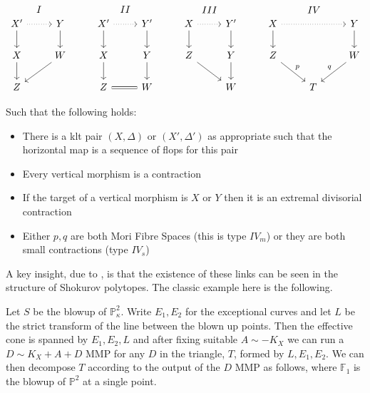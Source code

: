 \documentclass[a4paper,12pt]{book}
\begin{document}
	\[\begin{tikzcd}
	X' \arrow[d] \arrow[r, dotted] \arrow[r, "I", phantom, bend left=49] & Y \arrow[d]  & X' \arrow[r, dotted] \arrow[d] \arrow[r, "II",phantom, bend left=49] & Y' \arrow[d] & X \arrow[r, dotted] \arrow[d] \arrow[r, "III", phantom, bend left=49] & Y' \arrow[d] & X \arrow[d] \arrow[rr, dotted] \arrow[rr, "IV",phantom, bend left] &   & Y \arrow[d]       \\
	X \arrow[d]                                                          & W \arrow[ld] & X \arrow[d]                                               & Y \arrow[d]  & Z \arrow[rd]                                              & Y \arrow[d]  & Z \arrow[rd, "p"]                                          &   & W \arrow[ld, "q"'] \\
	Z                                                                    &              & Z \arrow[r, equal]                                                         & W            &                                                           & W            &                                                            & T &                  
	\end{tikzcd} \]
	
	Such that the following holds:
	\begin{itemize}
		\item There is a klt pair $(X,\Delta)$ or $(X',\Delta')$ as appropriate such that the horizontal map is a sequence of flops for this pair
		\item Every vertical morphism is a contraction
		\item If the target of a vertical morphism is $X$ or $Y$ then it is an extremal divisorial contraction
		\item Either $p,q$ are both Mori Fibre Spaces (this is type $IV_{m}$) or they are both small contractions (type $IV_{s}$)
	\end{itemize}
	
	A key insight, due to \cite{}, is that the existence of these links can be seen in the structure of Shokurov polytopes. The classic example here is the following.
	
	Let $S$ be the blowup of $\mathbb{P}^{2}_{\kappa}$. Write $E_{1},E_{2}$ for the exceptional curves and let $L$ be the strict transform of the line between the blown up points. Then the effective cone is spanned by $E_{1},E_{2},L$ and after fixing suitable $A \sim -K_{X}$ we can run a $D \sim K_{X}+A+D$ MMP for any $D$ in the triangle, $T$, formed by $L,E_{1},E_{2}$. We can then decompose $T$ according to the output of the $D$ MMP as follows, where $\mathbb{F}_{1}$ is the blowup of $\mathbb{P}^{2}$ at a single point.
	 
\end{document}
